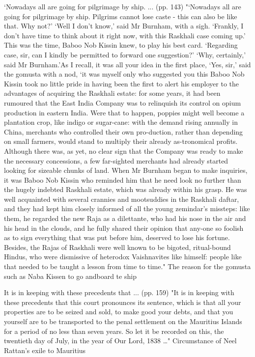 ‘Nowadays all are going for pilgrimage by ship. ... (pp. 143)
"‘Nowadays all are going for pilgrimage by ship. Pilgrims cannot lose caste - this can also be like that. Why not?’ ‘Well I don’t know,’ said Mr Burnham, with a sigh. ‘Frankly, I don’t have time to think about it right now, with this Raskhali case coming up.’ This was the time, Baboo Nob Kissin knew, to play his best card. ‘Regarding case, sir, can I kindly be permitted to forward one suggestion?’ ‘Why, certainly,’ said Mr Burnham.’As I recall, it was all your idea in the first place, ‘Yes, sir,’ said the gomusta with a nod, ‘it was myself only who suggested you this Baboo Nob Kissin took no little pride in having been the first to alert his employer to the advantages of acquiring the Raskhali estate: for some years, it had been rumoured that the East India Company was to relinquish its control on opium production in eastern India. Were that to happen, poppies might well become a plantation crop, like indigo or sugar-cane: with the demand rising annually in China, merchants who controlled their own pro-duction, rather than depending on small farmers, would stand to multiply their already as-tronomical profits. Although there was, as yet, no clear sign that the Company was ready to make the necessary concessions, a few far-sighted merchants had already started looking for sizeable chunks of land. When Mr Burnham began to make inquiries, it was Baboo Nob Kissin who reminded him that he need look no further than the hugely indebted Raskhali estate, which was already within his grasp. He was well acquainted with several crannies and mootsuddies in the Raskhali daftar, and they had kept him closely informed of all the young zemindar’s missteps: like them, he regarded the new Raja as a dilettante, who had his nose in the air and his head in the clouds, and he fully shared their opinion that any-one so foolish as to sign everything that was put before him, deserved to lose his fortune. Besides, the Rajas of Raskhali were well known to be bigoted, ritual-bound Hindus, who were dismissive of heterodox Vaishnavites like himself: people like that needed to be taught a lesson from time to time."
The reason for the gomusta such as Naba Kissen to go andboard te ship

It is in keeping with these precedents that ... (pp. 159)
"It is in keeping with these precedents that this court pronounces its sentence, which is that all your properties are to be seized and sold, to make good your debts, and that you yourself are to be transported to the penal settlement on the Mauritius Islands for a period of no less than seven years. So let it be recorded on this, the twentieth day of July, in the year of Our Lord, 1838 …"
Circumstance of Neel Rattan's exile to Mauritius

